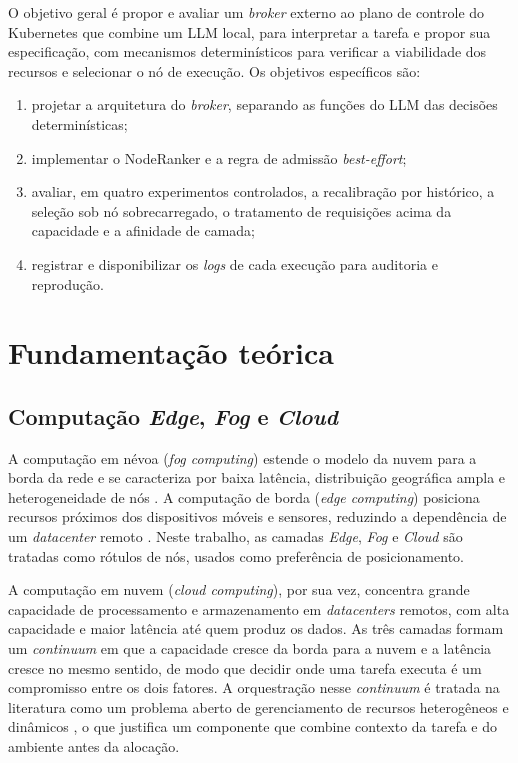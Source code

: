 \documentclass[11pt,a4paper]{article}
\begin{document}
O objetivo geral é propor e avaliar um \textit{broker} externo ao plano de
controle do Kubernetes que combine um LLM local, para interpretar a tarefa e
propor sua especificação, com mecanismos determinísticos para verificar a
viabilidade dos recursos e selecionar o nó de execução. Os objetivos
específicos são:
\begin{enumerate}[label=\alph*)]
  \item projetar a arquitetura do \textit{broker}, separando as funções do
        LLM das decisões determinísticas;
  \item implementar o NodeRanker e a regra de admissão
        \textit{best-effort};
  \item avaliar, em quatro experimentos controlados, a recalibração por
        histórico, a seleção sob nó sobrecarregado, o tratamento de
        requisições acima da capacidade e a afinidade de camada; 
  \item registrar e disponibilizar os \textit{logs} de cada execução para
        auditoria e reprodução.
\end{enumerate}

\section{Fundamentação teórica}\label{sec:fundamentacao}

\subsection{Computação \textit{Edge}, \textit{Fog} e \textit{Cloud}}

A computação em névoa (\textit{fog computing}) estende o modelo da nuvem para
a borda da rede e se caracteriza por baixa latência, distribuição geográfica
ampla e heterogeneidade de nós \cite{bonomi2012fog}. A computação de borda
(\textit{edge computing}) posiciona recursos próximos dos dispositivos
móveis e sensores, reduzindo a dependência de um \textit{datacenter} remoto
\cite{satyanarayanan2017edge}. Neste trabalho, as camadas \textit{Edge},
\textit{Fog} e \textit{Cloud} são tratadas como rótulos de nós, usados como
preferência de posicionamento.

A computação em nuvem (\textit{cloud computing}), por sua vez, concentra
grande capacidade de processamento e armazenamento em \textit{datacenters}
remotos, com alta capacidade e maior latência até quem produz os dados. As três
camadas formam um \textit{continuum} em que a capacidade cresce da borda para a
nuvem e a latência cresce no mesmo sentido, de modo que decidir onde uma tarefa
executa é um compromisso entre os dois fatores. A orquestração nesse
\textit{continuum} é tratada na literatura como um problema aberto de
gerenciamento de recursos heterogêneos e dinâmicos \cite{ullah2023continuum}, o
que justifica um componente que combine contexto da tarefa e do ambiente antes
da alocação.
\end{document}

